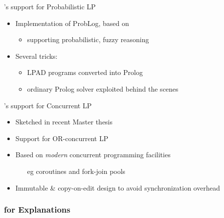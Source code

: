 \documentclass[presentation]{beamer}\mode<presentation>{\usetheme{AMSBolognaFC}}
\begin{document}
\begin{frame}{\twopkt{}'s support for Probabilistic LP}
    \vfill

    \begin{itemize}\small
        \item Implementation of \alert{ProbLog}, based on \twopkt{}
        \begin{itemize}
            \item supporting \alert{probabilistic}, fuzzy reasoning
        \end{itemize}
        \vfill
        \item Several tricks:
        \begin{itemize}
            \item LPAD programs \alert{converted} into Prolog
            \item ordinary Prolog solver exploited behind the scenes
        \end{itemize}
    \end{itemize}
\end{frame}

\begin{frame}{\twopkt{}'s support for Concurrent LP}
    \begin{itemize}

        \item Sketched in recent Master thesis

        \vfill

        \item Support for \alert{OR-concurrent} LP
        
        \vfill

        \item Based on \emph{modern} \alert{concurrent programming} facilities 
        \begin{itemize}
            \item[eg] coroutines and fork-join pools
        \end{itemize}

        \vfill

        \item Immutable \& \alert{copy-on-edit} design to avoid synchronization overhead
    \end{itemize}
\end{frame}

\subsubsection{\twopkt{} for Explanations}
\end{document}
